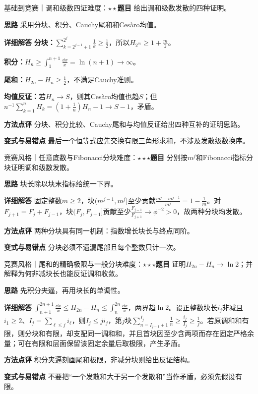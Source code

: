 \begin{example}{基础到竞赛｜调和级数四证}{难度：$\star\star$}\label{deep:ex:series_source_deep:harmonic4}\textbf{题目} 给出调和级数发散的四种证明。\par\textbf{思路} 采用分块、积分、Cauchy尾和和Cesàro均值。\par\textbf{详细解答} \textbf{分块：}$\sum_{k=2^{j-1}+1}^{2^j}\frac{1}{k}\ge\frac{1}{2}$，所以$H_{2^m}\ge1+\frac{m}{2}$。\par\textbf{积分：}$H_n\ge\int_1^{n+1}\frac{\dd x}{x}=\ln(n+1)\to\infty$。\par\textbf{尾和：}$H_{2n}-H_n\ge\frac{1}{2}$，不满足Cauchy准则。\par\textbf{均值反证：}若$H_n\to S$，则其Cesàro均值也趋$S$；但$n^{-1}\sum_{k=1}^nH_k=(1+\frac{1}{n})H_n-1\to S-1$，矛盾。\par\textbf{方法点评} 分块、积分比较、Cauchy尾和与均值反证给出四种互补的证明思路。\par\textbf{变式与易错点} 最后一个恒等式应先交换有限三角形求和，不涉及发散级数换序。\end{example}

\begin{example}{竞赛风格｜任意底数与Fibonacci分块}{难度：$\star\star\star$}\label{deep:ex:series_source_deep:harmonicblocks}\textbf{题目} 分别按$m^j$和Fibonacci指标分块证明调和级数发散。\par\textbf{思路} 块长除以块末指标给统一下界。\par\textbf{详细解答} 固定整数$m\ge2$，块$(m^{j-1},m^j]$至少贡献$\frac{m^j-m^{j-1}}{m^j}=1-\frac{1}{m}$。对$F_{j+1}=F_j+F_{j-1}$，块$(F_j,F_{j+1}]$贡献至少$\frac{F_{j-1}}{F_{j+1}}\to\phi^{-2}>0$，故两种分块均发散。\par\textbf{方法点评} 两种分块具有同一机制：指数增长块长与终点同阶。\par\textbf{变式与易错点} 分块必须不遗漏尾部且每个整数只计一次。\end{example}

\begin{example}{竞赛风格｜尾和的精确极限与一般分块}{难度：$\star\star\star$}\label{deep:ex:series_source_deep:harmonictail}\textbf{题目} 证明$H_{2n}-H_n\to\ln2$；并解释为何非减块长也能反证调和收敛。\par\textbf{思路} 先积分夹逼，再用块长的单调性。\par\textbf{详细解答} $\int_{n+1}^{2n+1}\frac{\dd x}{x}\le H_{2n}-H_n\le\int_n^{2n}\frac{\dd x}{x}$，两界趋$\ln2$。设正整数块长$i_j$非减且$i_1\ge2$、$I_j=\sum_{\ell\le j}i_\ell$，则$I_j\le ji_j$，第$j$块$\sum_{n=I_{j-1}+1}^{I_j}\frac{1}{n}\ge \frac{i_j}{I_j}\ge\frac{1}{j}$。若原调和和有限，则分块和有限，却支配同一调和和，并且首块因至少含两项而存在固定严格余量；可在有限和层面保留该固定余量后取极限，产生矛盾。\par\textbf{方法点评} 积分夹逼刻画尾和极限，非减分块则给出反证结构。\par\textbf{变式与易错点} 不要把“一个发散和大于另一个发散和”当作矛盾，必须先假设有限。\end{example}

